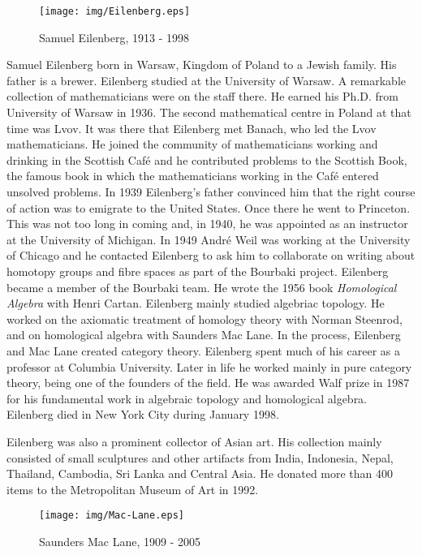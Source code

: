 \documentclass{article}
\begin{document}
\begin{wrapfigure}{R}{0.3\textwidth}
 \centering
 \texttt{[image: img/Eilenberg.eps]}
 \captionsetup{labelformat=empty}
 \caption{Samuel Eilenberg, 1913 - 1998}
 \label{fig:Eilenberg}
\end{wrapfigure}

Samuel Eilenberg born in Warsaw, Kingdom of Poland to a Jewish family. His father is a brewer. Eilenberg studied at the University of Warsaw. A remarkable collection of mathematicians were on the staff there. He earned his Ph.D. from University of Warsaw in 1936. The second mathematical centre in Poland at that time was Lvov. It was there that Eilenberg met Banach, who led the Lvov mathematicians. He joined the community of mathematicians working and drinking in the Scottish Café and he contributed problems to the Scottish Book, the famous book in which the mathematicians working in the Café entered unsolved problems. In 1939 Eilenberg's father convinced him that the right course of action was to emigrate to the United States. Once there he went to Princeton. This was not too long in coming and, in 1940, he was appointed as an instructor at the University of Michigan. In 1949 André Weil was working at the University of Chicago and he contacted Eilenberg to ask him to collaborate on writing about homotopy groups and fibre spaces as part of the Bourbaki project. Eilenberg became a member of the Bourbaki team. He wrote the 1956 book {\em Homological Algebra} with Henri Cartan. Eilenberg mainly studied algebriac topology. He worked on the axiomatic treatment of homology theory with Norman Steenrod, and on homological algebra with Saunders Mac Lane. In the process, Eilenberg and Mac Lane created category theory. Eilenberg spent much of his career as a professor at Columbia University. Later in life he worked mainly in pure category theory, being one of the founders of the field. He was awarded Walf prize in 1987 for his fundamental work in algebraic topology and homological algebra. Eilenberg died in New York City during January 1998.

Eilenberg was also a prominent collector of Asian art. His collection mainly consisted of small sculptures and other artifacts from India, Indonesia, Nepal, Thailand, Cambodia, Sri Lanka and Central Asia. He donated more than 400 items to the Metropolitan Museum of Art in 1992\cite{Wiki-Eilenberg}.

\begin{wrapfigure}{L}{0.3\textwidth}
 \centering
 \texttt{[image: img/Mac-Lane.eps]}
 \captionsetup{labelformat=empty}
 \caption{Saunders Mac Lane, 1909 - 2005}
 \label{fig:Mac-Lane}
\end{wrapfigure}
\end{document}
